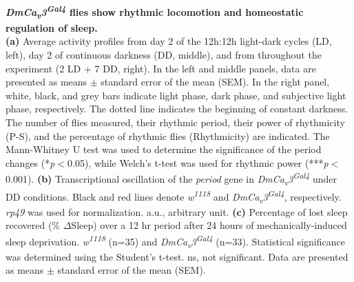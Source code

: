 \label{fig:4}
\textbf{ \emph{DmCa\textsubscript{v}3\textsuperscript{Gal4}} flies show rhythmic locomotion and homeostatic regulation of sleep.}
\\
\textbf{(a)} Average activity profiles from day 2 of the 12h:12h light-dark cycles (LD, left), day 2 of continuous darkness (DD, middle), and from throughout the experiment (2 LD + 7 DD, right).
In the left and middle panels, data are presented as means $\pm$ standard error of the mean (SEM).
In the right panel, white, black, and grey bars indicate light phase, dark phase, and subjective light phase, respectively.
The dotted line indicates the beginning of constant darkness. 
The number of flies measured, their rhythmic period, their power of rhythmicity (P-S), and the percentage of rhythmic flies (Rhythmicity) are indicated.
The Mann-Whitney U test was used to determine the significance of the period changes (*\emph{p}$<$0.05), while Welch's t-test was used for rhythmic power (***\emph{p}$<$0.001). 
\textbf{(b)} Transcriptional oscillation of the \emph{period} gene in \emph{DmCa\textsubscript{v}3\textsuperscript{Gal4}} under DD conditions. Black and red lines denote \emph{w\textsuperscript{1118}} and \emph{DmCa\textsubscript{v}3\textsuperscript{Gal4}}, respectively.
\emph{rp49} was used for normalization.
a.u., arbitrary unit.
\textbf{(c)} Percentage of lost sleep recovered (\% $\Delta$Sleep) over a 12 hr period after 24 hours of mechanically-induced sleep deprivation. \emph{w\textsuperscript{1118}} (n=35) and \emph{DmCa\textsubscript{v}3\textsuperscript{Gal4}} (n=33). 
Statistical significance was determined using the Student's t-test. 
ns, not significant.
Data are presented as means $\pm$ standard error of the mean (SEM).
